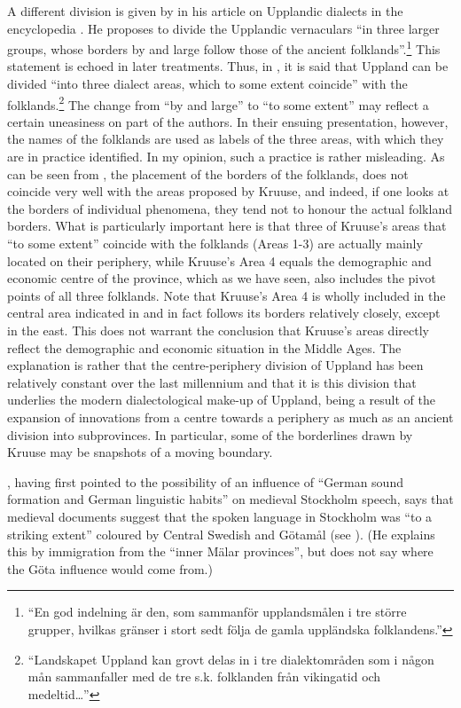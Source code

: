 A different division is given by \citet[1194]{Hesselman1920} in his article on Upplandic dialects in the encyclopedia . He proposes to divide the Upplandic vernaculars “in three larger groups, whose borders by and large follow those of the ancient folklands”.\footnote{ “En god indelning är den, som sammanför upplandsmålen i tre större grupper, hvilkas gränser i stort sedt följa de gamla uppländska folklandens.” } This statement is echoed in later treatments. Thus, in \citet[75]{KällskogEtAl1993}, it is said that Uppland can be divided “into three dialect areas, which to some extent coincide” with the folklands.\footnote{ “Landskapet Uppland kan grovt delas in i tre dialektområden som i någon mån sammanfaller med de tre s.k. folklanden från vikingatid och medeltid…” } The change from “by and large” to “to some extent” may reflect a certain uneasiness on part of the authors. In their ensuing presentation, however, the names of the folklands are used as labels of the three areas, with which they are in practice identified. In my opinion, such a practice is rather misleading. As can be seen from , the placement of the borders of the folklands, does not coincide very well with the areas proposed by Kruuse, and indeed, if one looks at the borders of individual phenomena, they tend not to honour the actual folkland borders. What is particularly important here is that three of Kruuse’s areas that “to some extent” coincide with the folklands (Areas 1-3) are actually mainly located on their periphery, while Kruuse’s Area 4 equals the demographic and economic centre of the province, which as we have seen, also includes the pivot points of all three folklands. Note that Kruuse’s Area 4 is wholly included in the central area indicated in  and in fact follows its borders relatively closely, except in the east. This does not warrant the conclusion that Kruuse’s areas directly reflect the demographic and economic situation in the Middle Ages. The explanation is rather that the centre-periphery division of Uppland has been relatively constant over the last millennium and that it is this division that underlies the modern dialectological make-up of Uppland, being a result of the expansion of innovations from a centre towards a periphery as much as an ancient division into subprovinces. In particular, some of the borderlines drawn by Kruuse may be snapshots of a moving boundary.

\citet[77]{Wessén1966}, having first pointed to the possibility of an influence of “German sound formation and German linguistic habits” on medieval Stockholm speech, says that medieval documents suggest that the spoken language in Stockholm was “to a striking extent” coloured by Central Swedish and Götamål (see ). (He explains this by immigration from the “inner Mälar provinces”, but does not say where the Göta influence would come from.)

